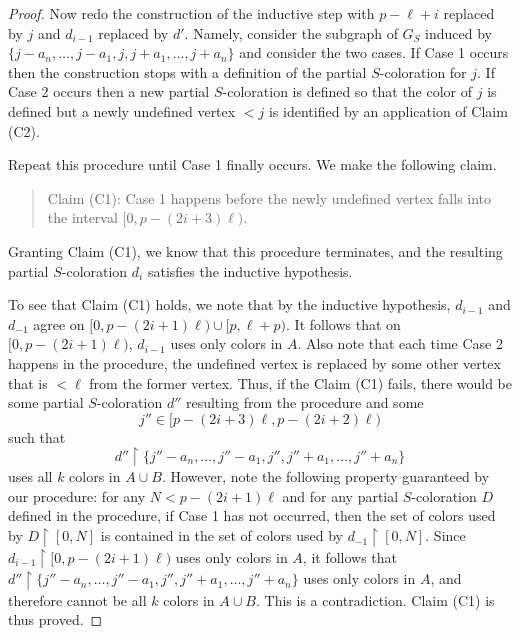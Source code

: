 \documentclass[11pt]{amsart}
\theoremstyle{definition}
\begin{document}
\begin{proof}
Now redo the construction of the inductive step  with $p-\ell+i$ replaced by $j$ and $d_{i-1}$ replaced by $d'$. Namely, consider the subgraph of $G_S$ induced by $\{j-a_n, \dots, j-a_1, j, j+a_1,\dots, j+a_n\}$ and consider the two cases. If Case 1 occurs then the construction stops with a definition of the partial $S$-coloration for $j$. If Case 2 occurs then a new partial $S$-coloration is defined so that the color of $j$ is defined but a newly undefined vertex $<j$ is identified by an application of Claim (C2). 

Repeat this procedure until Case 1 finally occurs. We make the following claim.
\begin{quote}
Claim (C1): Case 1 happens before the newly undefined vertex falls into the interval $\big[0, p-(2i+3)\ell\big)$. 
\end{quote}
Granting Claim (C1), we know that this procedure terminates, and the resulting partial $S$-coloration $d_i$ satisfies the inductive hypothesis. 


To see that Claim (C1) holds, we note that by the inductive hypothesis, $d_{i-1}$ and $d_{-1}$ agree on $\big[0, p-(2i+1)\ell\big)\cup \big[p, \ell+p\big)$. It follows that on $\big[0, p-(2i+1)\ell\big)$, $d_{i-1}$ uses only colors in $A$.  Also note that each time Case 2 happens in the procedure, the undefined vertex is replaced by some other vertex that is $<\ell$ from the former vertex. Thus, if the Claim (C1) fails, there would be some partial $S$-coloration $d''$ resulting from the procedure and some $$j''\in [p-(2i+3)\ell, p-(2i+2)\ell)$$ such that $$d''\upharpoonright \{j''-a_n, \dots, j''-a_1, j'', j''+a_1, \dots, j''+a_n\}$$ uses all $k$ colors in $A\cup B$. However, note the following property guaranteed by our procedure:  for any $N<p-(2i+1)\ell$ and for any partial $S$-coloration $D$ defined in the procedure, if Case 1 has not occurred, then the set of colors used by $D\upharpoonright [0, N]$ is contained in the set of colors used by $d_{-1}\upharpoonright [0, N]$. Since $d_{i-1}\upharpoonright [0, p-(2i+1)\ell)$  uses only colors in $A$, it follows that $d''\upharpoonright \{j''-a_n, \dots, j''-a_1, j'', j''+a_1, \dots, j''+a_n\}$ uses only colors in $A$, and therefore cannot be all $k$ colors in $A\cup B$. This is a contradiction. Claim (C1) is thus proved.


\end{proof}
\end{document}
